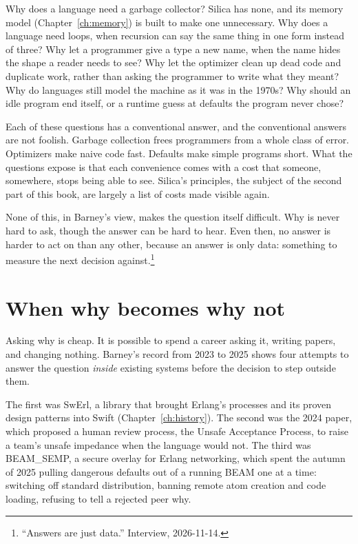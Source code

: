 Why does a language need a garbage collector? Silica has none, and its memory
model (Chapter~\ref{ch:memory}) is built to make one unnecessary.
Why does a language need loops, when recursion can say the same thing in one
form instead of three? Why let a programmer give a type a new name, when the
name hides the shape a reader needs to see? Why let the optimizer clean up dead
code and duplicate work, rather than asking the programmer to write what they
meant? Why do languages still model the machine as it was in the 1970s?
Why should an idle program end itself, or a runtime guess at defaults the
program never chose?

Each of these questions has a conventional answer, and the conventional
answers are not foolish. Garbage collection frees programmers from a whole
class of error. Optimizers make naive code fast. Defaults make simple programs
short. What the questions expose is that each convenience comes with a cost
that someone, somewhere, stops being able to see. Silica's principles,
the subject of the second part of this book, are largely a list of costs
made visible again.

None of this, in Barney's view, makes the question itself difficult. Why is
never hard to ask, though the answer can be hard to hear. Even then, no answer is
harder to act on than any other, because an answer is only data: something to
measure the next decision against.\footnote{``Answers are just data.'' Interview, 2026-11-14.}

\section{When why becomes why not}

Asking why is cheap. It is possible to spend a career asking it, writing
papers, and changing nothing. Barney's record from 2023 to 2025 shows four
attempts to answer the question \emph{inside} existing systems before the
decision to step outside them.

The first was SwErl, a library that brought Erlang's processes and its
proven design patterns into Swift (Chapter~\ref{ch:history}). The second
was the 2024 paper, which proposed a human review process, the Unsafe
Acceptance Process, to raise a team's unsafe impedance when the language would
not. The third was BEAM\_SEMP, a secure overlay for Erlang networking, which
spent the autumn of 2025 pulling dangerous defaults out of a running BEAM one
at a time: switching off standard distribution, banning remote atom creation
and code loading, refusing to tell a rejected peer why.


